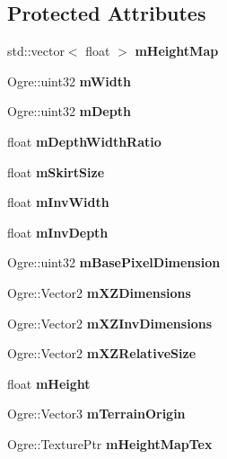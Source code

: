 \subsection*{Protected Attributes}
\begin{DoxyCompactItemize}
\item 
\mbox{\label{class_terrain_a0e7124f6a957a2adabe4820f9f96609d}} 
std\+::vector$<$ float $>$ {\bfseries m\+Height\+Map}
\item 
\mbox{\label{class_terrain_a6ea67033a348cbe2c2f1a30130ee9fa2}} 
Ogre\+::uint32 {\bfseries m\+Width}
\item 
\mbox{\label{class_terrain_a0c09ca663727370da6c32e700260c97d}} 
Ogre\+::uint32 {\bfseries m\+Depth}
\item 
\mbox{\label{class_terrain_a069c3ccaa388a69a0234cd439613f227}} 
float {\bfseries m\+Depth\+Width\+Ratio}
\item 
\mbox{\label{class_terrain_a954d59e15e7015f7d35dfd540eec5614}} 
float {\bfseries m\+Skirt\+Size}
\item 
\mbox{\label{class_terrain_a3c2af35db2a535399da1042dfaa33f7a}} 
float {\bfseries m\+Inv\+Width}
\item 
\mbox{\label{class_terrain_a7a558b8126aa9cbe1db94d8594c23b10}} 
float {\bfseries m\+Inv\+Depth}
\item 
\mbox{\label{class_terrain_a51ed9c18ce43049069d91050725b02f6}} 
Ogre\+::uint32 {\bfseries m\+Base\+Pixel\+Dimension}
\item 
\mbox{\label{class_terrain_aa69fad98c484b1693e6799dd43b63740}} 
Ogre\+::\+Vector2 {\bfseries m\+X\+Z\+Dimensions}
\item 
\mbox{\label{class_terrain_a259c829335b24569bd1a4b14f8a0112f}} 
Ogre\+::\+Vector2 {\bfseries m\+X\+Z\+Inv\+Dimensions}
\item 
\mbox{\label{class_terrain_a957653a8d23d3655c025765914f54fbf}} 
Ogre\+::\+Vector2 {\bfseries m\+X\+Z\+Relative\+Size}
\item 
\mbox{\label{class_terrain_afb0c042f174d26d388fa4ccbcf5e7b35}} 
float {\bfseries m\+Height}
\item 
\mbox{\label{class_terrain_a96a43b46173a00ed494f4e33e479692e}} 
Ogre\+::\+Vector3 {\bfseries m\+Terrain\+Origin}
\item 
\mbox{\label{class_terrain_a2531cf9b13520ac5a59d03850057ec30}} 
Ogre\+::\+Texture\+Ptr {\bfseries m\+Height\+Map\+Tex}
\end{DoxyCompactItemize}
